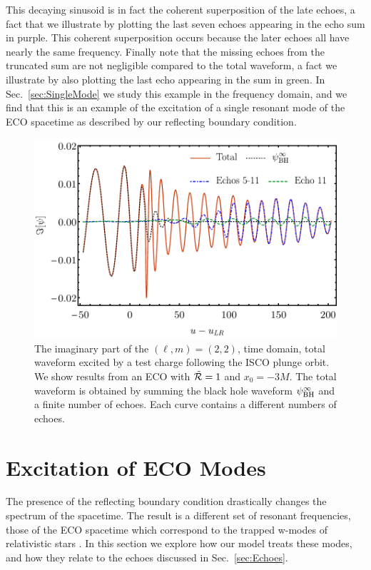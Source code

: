 \begin{refsection}
This decaying sinusoid is in fact the coherent superposition of the late echoes, a fact that we illustrate by plotting the last seven echoes appearing in the echo sum in purple. 
This coherent superposition occurs because  the later echoes all have nearly the same frequency. 
Finally note that the missing echoes from the truncated sum are not negligible compared to the total waveform, a fact we illustrate by also plotting the last echo appearing in the sum in green. 
In Sec.~\ref{sec:SingleMode} we study this example in the frequency domain, and we find that this is an example of the excitation of a single resonant mode of the ECO spacetime as described by our reflecting boundary condition.

\begin{figure}[t]
\includegraphics[width = 1 \columnwidth]{chapter_echo/etc/singlemodeplot}
\caption{
The imaginary part of the $(\ell,m)=(2,2)$, time domain, total waveform excited by a test charge following the ISCO plunge orbit. We show results from an ECO with $\tilde{\mathcal R}=1$ and $x_0 =-3M$. The total waveform is obtained by summing the black hole waveform $\psi^\infty_{\rm BH}$ and a finite number of echoes. Each curve contains a different numbers of echoes.
}
\label{fig:SingleECOModeTime}
\end{figure}

\section{Excitation of ECO Modes}
\label{sec:ECOExcitation}

The presence of the reflecting boundary condition drastically changes the spectrum of the spacetime.
The result is a different set of resonant frequencies, those of the ECO spacetime which correspond to the trapped w-modes of relativistic stars \cite{Kokkotas:1995av,Andersson:1995ez,Andersson1996wm,Benhar:1998au,Volkel:2017ofl}.
In this section we explore how our model treats these modes, and how they relate to the echoes discussed in Sec.~\ref{sec:Echoes}.


\end{refsection}
